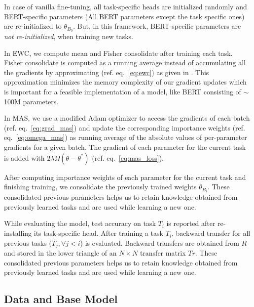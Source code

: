 \documentclass[11pt,a4paper]{article}
\begin{document}


In case of vanilla fine-tuning, all task-specific heads are initialized randomly and BERT-specific parameters  (All BERT parameters except the task specific ones) are re-initialized to $\theta_{B_0}$.  But, in this framework, BERT-specific parameters  are \textit{not re-initialized}, when training new tasks.   


In EWC, we compute mean and Fisher consolidate after training each task.  Fisher consolidate is computed as a running average instead of accumulating all the gradients by approximating (ref. eq.~\ref{eq:ewc}) as given in \citealt{Rao1992}.  This approximation minimizes the memory complexity of our gradient updates which is important for a feasible implementation of a model, like BERT consisting of $\sim$100M parameters.

In MAS, we use a modified Adam optimizer to access the gradients of each batch (ref. eq.~\ref{eq:grad_mas}) and update the corresponding importance weights (ref. eq.~\ref{eq:omega_mas}) as running average of the absolute values of per-parameter gradients for a given batch. The gradient of each parameter for the current task is added with $2{\lambda} \Omega (\theta-\theta^*)$ (ref. eq.~\ref{eq:mas_loss}).

After computing importance weights of each parameter for the current task and finishing training, we consolidate the previously trained weights $\theta_{B_i}$. These consolidated previous parameters helps us to retain knowledge obtained from previously learned tasks and are used while learning a new one.

While evaluating the model, test accuracy on task $T_i$ is reported after re-installing its task-specific head. After training a task $T_i$, backward transfer for all previous tasks  ($T_j, \forall j<i$) is evaluated. Backward transfers are obtained from $R$ and stored in the lower triangle of an $N \times N$ transfer matrix $Tr$.  These consolidated previous parameters helps us to retain knowledge obtained from previously learned tasks and are used while learning a new one.


\subsection{Data and Base Model}
\label{sec:data}
\end{document}

